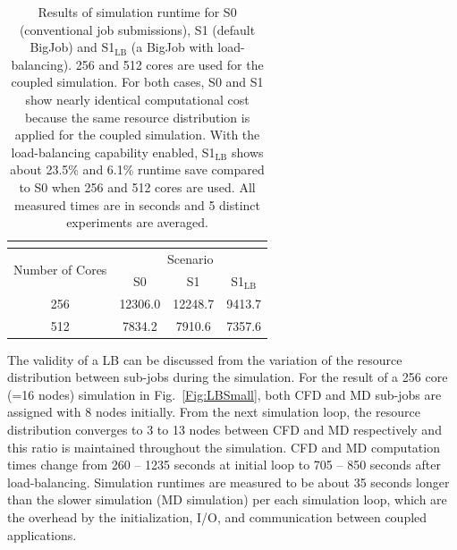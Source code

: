 \documentclass[preprint,12pt]{elsarticle}
\newcommand{\subscript}[1]{\ensuremath{_{\textrm{#1}}}}
\newcommand{\lb}[0]{\subscript{LB} }
\begin{document}
\begin{table}
  \caption{\small Results of simulation runtime for S0 (conventional job submissions), 
S1 (default BigJob) and S1\lb (a BigJob with load-balancing). 256 and 512
cores are used for the coupled simulation. For both cases, S0 and S1 show
nearly identical computational cost because the same resource distribution is
applied for the coupled simulation. With the load-balancing capability enabled,
S1\lb shows about 23.5\% and 6.1\% runtime save compared to S0 
when 256 and 512 cores are used.
All measured times are in seconds and 5 distinct experiments are averaged.}
\label{table:oneBJ_Test}
\centering
\footnotesize
 \begin{tabular}{c | c | c | c }
 \multicolumn{4}{c}{\phantom{\tiny 100}}\\
\hline
\multirow{2}{0.15\textwidth}{Number of Cores} & \multicolumn{3}{c}{Scenario} \\
\cline{2-4} 
& \multirow{1}{0.15\textwidth}{S0} & 
\multirow{1}{0.15\textwidth}{S1} & \multirow{1}{0.15\textwidth}{S1\lb} \\
\hline
\hline
256 & 12306.0 & 12248.7 & 9413.7 \\
512 & 7834.2 & 7910.6 & 7357.6 \\ 
\hline
\end{tabular} %
\vspace{-1em}
\end{table}

The validity of a LB can be discussed from the variation of 
the resource distribution between sub-jobs during the simulation.
For the result of a 256 core (=16 nodes) simulation in Fig.~\ref{Fig:LBSmall}, 
both CFD and MD sub-jobs are assigned with 8 nodes initially. 
From the next simulation loop, the resource distribution converges to
3 to 13 nodes between CFD and MD respectively and this ratio is maintained 
throughout the simulation. CFD and MD computation times change 
from 260 -- 1235 seconds at initial loop to 705 -- 850 seconds after load-balancing.
Simulation runtimes are measured to be about 35 seconds longer than
the slower simulation (MD simulation) per each simulation loop, 
which are the overhead by the initialization, I/O, and
communication between coupled applications.
\end{document}
